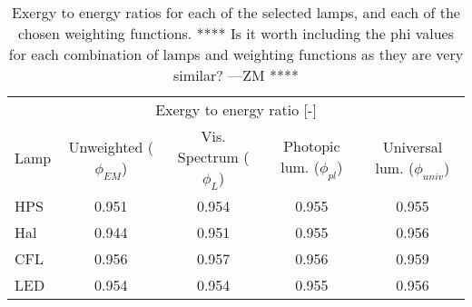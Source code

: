 

\begin{table}
\centering %
\caption{Exergy to energy ratios for each of the selected lamps, and each of the chosen weighting functions. **** Is it worth including the phi values for each combination of lamps and weighting functions as they are very similar? ---ZM ****}
\begin{tabular}{l c c c c}
\hline
\multicolumn{5}{c}{Exergy to energy ratio [-]} \\
\cline{2-5}
  Lamp 
      & Unweighted ($\phi_{EM}$)
      & Vis. Spectrum ($\phi_{L}$)
      & Photopic lum. ($\phi_{pl}$)
      & Universal lum. ($\phi_{univ}$)  \\
\hline
  HPS & 0.951 & 0.954 & 0.955 & 0.955 \\
  Hal & 0.944 & 0.951 & 0.955 & 0.956 \\
  CFL & 0.956 & 0.957 & 0.956 & 0.959 \\
  LED & 0.954 & 0.954 & 0.955 & 0.956 \\
\hline
\end{tabular}
\label{tab:results_phi}
\end{table}